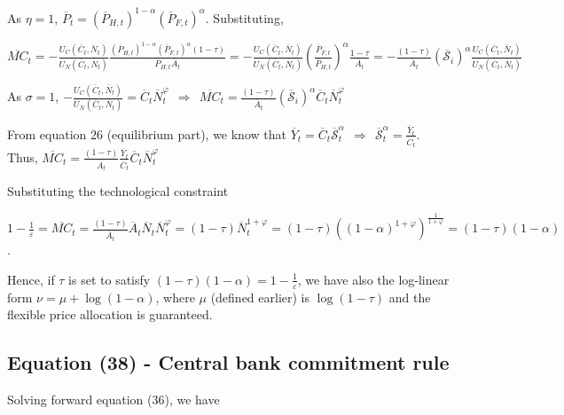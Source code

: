 \documentclass[
]{article}
\begin{document}
As \(\eta=1\),
\(\overline{P}_t=(\overline{P}_{H,t})^{1-\alpha}(\overline{P}_{F,t})^\alpha\).
Substituting,

\(\displaystyle \overline{MC}_t= -\frac{U_C(\overline{C}_t,\overline{N}_t)}{U_N(\overline{C}_t,\overline{N}_t)}\frac{(\overline{P}_{H,t})^{1-\alpha}(\overline{P}_{F,t})^\alpha (1-\tau)}{\overline{P}_{H,t} \overline{A}_t}= -\frac{U_C(\overline{C}_t,\overline{N}_t)}{U_N(\overline{C}_t,\overline{N}_t)} \left( \frac{\overline{P}_{F,t}}{\overline{P}_{H,t}} \right)^\alpha \frac{1-\tau}{\overline{A}_t}= -\frac{(1-\tau)}{\overline{A}_t} (\mathcal{\overline{S}}_i)^\alpha \frac{U_C(\overline{C}_t,\overline{N}_t)}{U_N(\overline{C}_t,\overline{N}_t)}\)

As \(\sigma=1\),
\(\displaystyle -\frac{U_C(\overline{C}_t,\overline{N}_t)}{U_N(\overline{C}_t,\overline{N}_t)}=\overline{C}_t \overline{N}_t^\varphi \ \ \Rightarrow \ \ \overline{MC}_t= \frac{(1-\tau)}{\overline{A}_t} (\mathcal{\overline{S}}_i)^\alpha \overline{C}_t \overline{N}_t^\varphi\)

From equation 26 (equilibrium part), we know that
\(\displaystyle \overline{Y}_t=\overline{C}_t \mathcal{\overline{S}}_t^\alpha \ \ \Rightarrow \ \  \mathcal{\overline{S}}_t^\alpha = \frac{\overline{Y}_t}{\overline{C}_t}\).
Thus,
\(\displaystyle \overline{MC}_t= \frac{(1-\tau)}{\overline{A}_t} \frac{\overline{Y}_t}{\overline{C}_t} \overline{C}_t \overline{N}_t^\varphi\)

Substituting the technological constraint

\(\displaystyle 1-\frac{1}{\varepsilon}=\overline{MC}_t= \frac{(1-\tau)}{\overline{A}_t} \overline{A}_t \overline{N}_t \overline{N}_t^\varphi=(1-\tau) \overline{N}_t^{1+\varphi}=(1-\tau)\left( (1-\alpha)^{1+\varphi} \right)^{\frac{1}{1+\varphi}}=(1-\tau)(1-\alpha)\).

Hence, if \(\tau\) is set to satisfy
\(\displaystyle (1-\tau)(1-\alpha)= 1-\frac{1}{\varepsilon}\), we have
also the log-linear form \(\nu=\mu+\log(1-\alpha)\), where \(\mu\)
(defined earlier) is \(\log(1-\tau)\) and the flexible price allocation
is guaranteed.

\hypertarget{equation-38---central-bank-commitment-rule}{%
\subsection{Equation (38) - Central bank commitment
rule}\label{equation-38---central-bank-commitment-rule}}

Solving forward equation (36), we have
\end{document}
